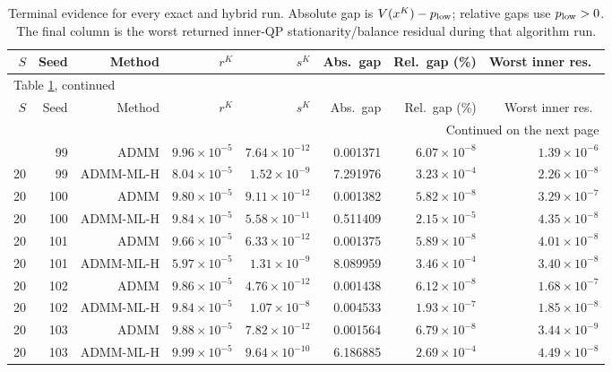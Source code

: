 \begin{longtable}{rrrrrrrr}
\caption{Terminal evidence for every exact and hybrid run. Absolute gap is $V(x^K)-p_{\rm low}$; relative gaps use $p_{\rm low}>0$. The final column is the worst returned inner-QP stationarity/balance residual during that algorithm run.}\label{tab:termination}\\
\toprule
$S$ & Seed & Method & $r^K$ & $s^K$ & Abs.\ gap & Rel.\ gap (\%) & Worst inner res.\ \\
\midrule\endfirsthead
\multicolumn{8}{l}{Table \ref*{tab:termination}, continued}\\
\toprule
$S$ & Seed & Method & $r^K$ & $s^K$ & Abs.\ gap & Rel.\ gap (\%) & Worst inner res.\ \\
\midrule\endhead
\midrule\multicolumn{8}{r}{Continued on the next page}\\\endfoot
\bottomrule\endlastfoot
20 & 99 & ADMM & $9.96\times 10^{-5}$ & $7.64\times 10^{-12}$ & 0.001371 & $6.07\times 10^{-8}$ & $1.39\times 10^{-6}$ \\
20 & 99 & ADMM-ML-H & $8.04\times 10^{-5}$ & $1.52\times 10^{-9}$ & 7.291976 & $3.23\times 10^{-4}$ & $2.26\times 10^{-8}$ \\
\midrule
20 & 100 & ADMM & $9.80\times 10^{-5}$ & $9.11\times 10^{-12}$ & 0.001382 & $5.82\times 10^{-8}$ & $3.29\times 10^{-7}$ \\
20 & 100 & ADMM-ML-H & $9.84\times 10^{-5}$ & $5.58\times 10^{-11}$ & 0.511409 & $2.15\times 10^{-5}$ & $4.35\times 10^{-8}$ \\
\midrule
20 & 101 & ADMM & $9.66\times 10^{-5}$ & $6.33\times 10^{-12}$ & 0.001375 & $5.89\times 10^{-8}$ & $4.01\times 10^{-8}$ \\
20 & 101 & ADMM-ML-H & $5.97\times 10^{-5}$ & $1.31\times 10^{-9}$ & 8.089959 & $3.46\times 10^{-4}$ & $3.40\times 10^{-8}$ \\
\midrule
20 & 102 & ADMM & $9.86\times 10^{-5}$ & $4.76\times 10^{-12}$ & 0.001438 & $6.12\times 10^{-8}$ & $1.68\times 10^{-7}$ \\
20 & 102 & ADMM-ML-H & $9.84\times 10^{-5}$ & $1.07\times 10^{-8}$ & 0.004533 & $1.93\times 10^{-7}$ & $1.85\times 10^{-8}$ \\
\midrule
20 & 103 & ADMM & $9.88\times 10^{-5}$ & $7.82\times 10^{-12}$ & 0.001564 & $6.79\times 10^{-8}$ & $3.44\times 10^{-9}$ \\
20 & 103 & ADMM-ML-H & $9.99\times 10^{-5}$ & $9.64\times 10^{-10}$ & 6.186885 & $2.69\times 10^{-4}$ & $4.49\times 10^{-8}$ \\

\end{longtable}
